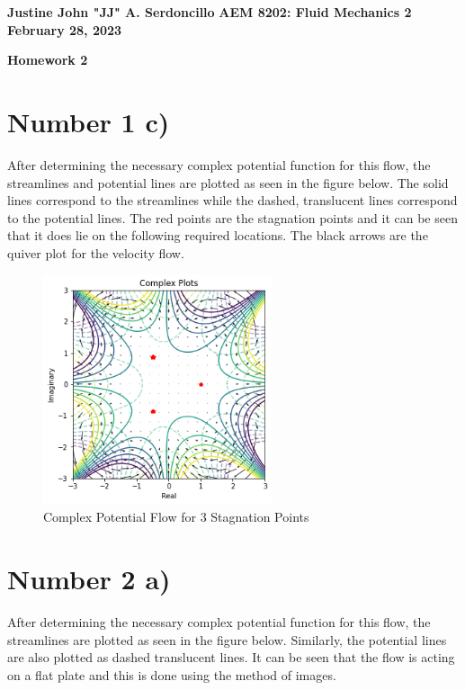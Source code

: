 \documentclass{article}
\begin{document}
	
	\noindent\textbf{Justine John "JJ" A. Serdoncillo}
	\hfill \textbf{AEM 8202: Fluid Mechanics 2} \\ \hfill \textbf{February 28, 2023}
	
	\begin{center}
		\Large{\textbf{Homework 2}}    
	\end{center}
	
	\section*{Number 1 c)}
		After determining the necessary complex potential function for this flow, the streamlines and potential lines are plotted as seen in the figure below. The solid lines correspond to the streamlines while the dashed, translucent lines correspond to the potential lines. The red points are the stagnation points and it can be seen that it does lie on the following required locations. The black arrows are the quiver plot for the velocity flow. 

		\begin{figure}[H]
			\centering
			\includegraphics[width=0.6\textwidth]{images/first.png}
			\caption{ Complex Potential Flow for 3 Stagnation Points}
		\end{figure}
	
	\section*{Number 2 a)}
		After determining the necessary complex potential function for this flow, the streamlines are plotted as seen in the figure below. Similarly, the potential lines are also plotted as dashed translucent lines. It can be seen that the flow is acting on a flat plate and this is done using the method of images. 
		
\end{document}
